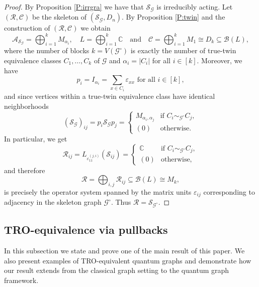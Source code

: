 \documentclass[11pt]{amsart}
\numberwithin{equation}{section}
\theoremstyle{plain}
\theoremstyle{definition}
\theoremstyle{remark}
\newcommand{\A}{{\mathcal{A}}}
\newcommand{\B}{{\mathcal{B}}}
\newcommand{\C}{{\mathcal{C}}}
\newcommand{\G}{{\mathcal{G}}}
\newcommand{\R}{{\mathcal{R}}}
\renewcommand{\S}{{\mathcal{S}}}
\newcommand{\eps}{\varepsilon}
\def\al{\alpha}
\newcommand{\bC}{\mathbb{C}}
\newcommand{\foral}{\text{ for all }}
\newcommand{\qand}{\quad\text{and}\quad}
\begin{document}
\begin{proof}
By Proposition \ref{P:irrgra} we have that $\S_\G$ is irreducibly acting. Let $(\R,\C)$ be the skeleton of $(\S_\G,D_n)$. By Proposition \ref{P:twin} and the construction of $(\R,\C)$ we obtain
\[
\A_{\S_{\G}}
=\bigoplus_{i=1}^k M_{\alpha_i}, 
\quad 
L=\bigoplus_{i=1}^k \mathbb C
\qand 
\C=\bigoplus_{i=1}^k M_1\cong D_k \subseteq \B(L),
\]
where the number of blocks $k=V(\G^\circ)$ is exactly the number of true-twin equivalence classes $C_1,\dots,C_k$ of $\G$ and $\al_i= |C_i|$ for all $i\in[k]$. Moreover, we have 
\[
p_i=I_{\al_i}=\sum_{x\in C_i} \eps_{xx} \foral i\in[k],
\]
and since vertices within a true-twin equivalence class have identical neighborhoods
\[
(\S_\G)_{ij}
=
p_i \S_\G p_j
=
\begin{cases}
M_{\alpha_i,\alpha_j} & \text{if } C_i\sim_{\G^\circ}C_j,\\
(0) & \text{otherwise.}
\end{cases}
\]
In particular, we get
\[
\R_{ij}
=
L_{\varepsilon^{(j,i)}_{11}}(\S_{ij})
=
\begin{cases}
\bC & \text{if } C_i\sim_{\G^\circ}C_j,\\
(0) & \text{otherwise,}
\end{cases}
\]
and therefore
\[
\R
=
\bigoplus_{i,j}\R_{ij}
\subseteq \B(L)\cong M_k,
\]
is precisely the operator system spanned by the matrix units $\eps_{ij}$
corresponding to adjacency in the skeleton graph $\G^\circ$.
Thus $\R=\S_{\G^\circ}$.
\end{proof}

\subsection{TRO-equivalence via pullbacks}
In this subsection we state and prove one of the main result of this paper. We also present examples of TRO-equivalent quantum graphs and demonstrate how our result extends \cite[Corollary~7.6]{EKT21} from the classical graph setting to the quantum graph framework.
\end{document}
